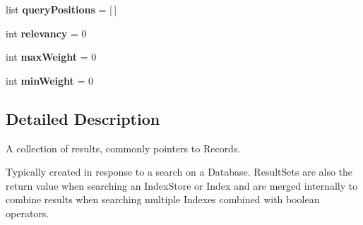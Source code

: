 \begin{DoxyCompactItemize}
\item 
\hypertarget{classcheshire3_1_1base_objects_1_1_result_set_adfb3d54639c45e55b31192069bd60182}{list {\bfseries query\-Positions} = \mbox{[}$\,$\mbox{]}}\label{classcheshire3_1_1base_objects_1_1_result_set_adfb3d54639c45e55b31192069bd60182}

\item 
\hypertarget{classcheshire3_1_1base_objects_1_1_result_set_a9b344f6944db85efe3c2df5537c9546e}{int {\bfseries relevancy} = 0}\label{classcheshire3_1_1base_objects_1_1_result_set_a9b344f6944db85efe3c2df5537c9546e}

\item 
\hypertarget{classcheshire3_1_1base_objects_1_1_result_set_a0aabb8fd82f8bd0460479e2b14d28de0}{int {\bfseries max\-Weight} = 0}\label{classcheshire3_1_1base_objects_1_1_result_set_a0aabb8fd82f8bd0460479e2b14d28de0}

\item 
\hypertarget{classcheshire3_1_1base_objects_1_1_result_set_a220deeae2c9f4b55a8f43183336138e0}{int {\bfseries min\-Weight} = 0}\label{classcheshire3_1_1base_objects_1_1_result_set_a220deeae2c9f4b55a8f43183336138e0}

\end{DoxyCompactItemize}


\subsection{Detailed Description}
\begin{DoxyVerb}A collection of results, commonly pointers to Records.

Typically created in response to a search on a Database. ResultSets are 
also the return value when searching an IndexStore or Index and are merged 
internally to combine results when searching multiple Indexes combined 
with boolean operators.
\end{DoxyVerb}
 

